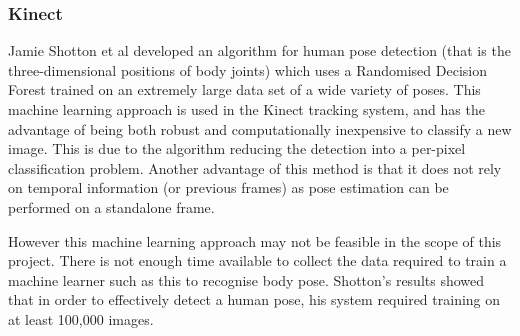 \subsubsection{Kinect}

Jamie Shotton et al developed an algorithm\cite{shottonkinect} for human pose detection (that is the three-dimensional positions of body joints) which uses a Randomised Decision Forest trained on an extremely large data set of a wide variety of poses. This machine learning approach is used in the Kinect tracking system, and has the advantage of being both robust and computationally inexpensive to classify a new image. This is due to the algorithm reducing the detection into a per-pixel classification problem. Another advantage of this method is that it does not rely on temporal information (or previous frames) as pose estimation can be performed on a standalone frame.

However this machine learning approach may not be feasible in the scope of this project. There is not enough time available to collect the data required to train a machine learner such as this to recognise body pose. Shotton's results showed that in order to effectively detect a human pose, his system required training on at least 100,000 images\cite{shottonkinect}.